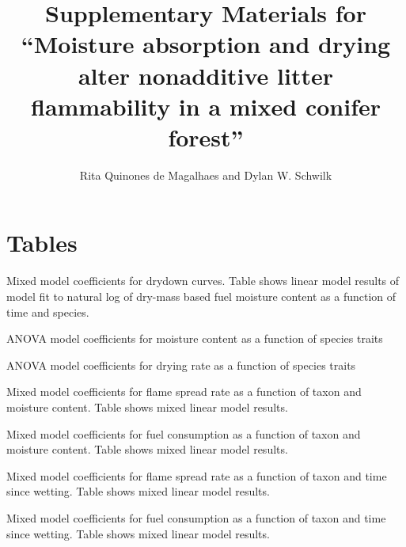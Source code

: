 \documentclass[letterpaper]{article}
\title{Supplementary Materials for ``Moisture absorption and drying alter nonadditive litter flammability in a mixed conifer forest''}
\author{Rita Quinones de Magalhaes and Dylan W. Schwilk}
\date{}
\begin{document}
\maketitle

\section*{Tables}

\begin{table}[H]
  \caption{Mixed model coefficients for drydown curves. Table shows linear model results of model fit to  natural log of dry-mass based fuel moisture content as a function of time and species.} 
  \label{tabS1}
\centering

\end{table}

\begin{table}[H]
  \caption{ANOVA model coefficients for moisture content as a function of species traits} 
  \label{tabS2}
\centering

\end{table}

\begin{table}[H]
  \caption{ANOVA model coefficients for drying rate as a function of species traits} 
  \label{tabS3}
\centering

\end{table}

\begin{table}[H]
  \caption{Mixed model coefficients for flame spread rate as a function of taxon and moisture content. Table shows mixed linear model results.} 
  \label{tabS4}
\centering

\end{table}

\begin{table}[H]
  \caption{Mixed model coefficients for fuel consumption as a function of taxon and moisture content. Table shows mixed linear model results.} 
  \label{tabS5}
\centering

\end{table}


\begin{table}[H]
  \caption{Mixed model coefficients for flame spread rate as a function of taxon and time since wetting. Table shows mixed linear model results.} 
  \label{tabS6}
\centering

\end{table}

\begin{table}[H]
  \caption{Mixed model coefficients for fuel consumption as a function of taxon and time since wetting. Table shows mixed linear model results.} 
  \label{tabS7}
\centering

\end{table}
\end{document}
